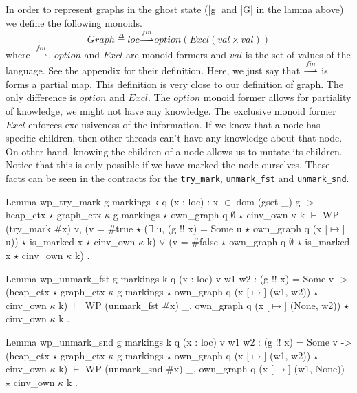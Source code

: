\documentclass[nocopyrightspace]{sigplanconf}
\def\MyMLe{\lstinline[language=MyML, basicstyle=\small\ttfamily]}
\newcommand{\defeq}{\overset{\Delta}{=}}
\newcommand{\val}{\mathit{val}}
\newcommand{\loc}{\mathit{loc}}
\newcommand{\option}{\mathit{option}}
\newcommand{\Excl}{\mathit{Excl}}
\newcommand{\finmap}{\overset{\mathit{fin}}{\rightharpoonup}}
\begin{document}
In order to represent graphs in the ghost state (\Coqe|g| and \Coqe|G| in the lamma above) we define the following monoids.
\[
\mathit{Graph} \defeq \loc \finmap \option(\Excl(\val \times \val))
\]
where $\finmap$, $\option$ and $\Excl$ are monoid formers and $\val$ is the set of values of the language.
See the appendix for their definition.
Here, we just say that $\finmap$ is forms a partial map.
This definition is very close to our definition of graph.
The only difference is $\option$ and $\Excl$.
The $\option$ monoid former allows for partiality of knowledge,
we might not have any knowledge.
The exclusive monoid former $\Excl$ enforces exclusiveness of the
information.
If we know that a node has specific children, then other threads
can't have any knowledge about that node.
On other hand, knowing the children of a node allows us to mutate its
children. Notice that this is only possible if we have marked the node
ourselves.
These facts can be seen in the contracts for the \MyMLe{try_mark},
\MyMLe{unmark_fst} and \MyMLe{unmark_snd}.
\begin{Coq}
Lemma wp_try_mark g markings k q (x : loc) : x $\in$ dom (gset _) g ->
    heap_ctx $\star$ graph_ctx $\kappa$ g markings $\star$ own_graph q $\emptyset$
     $\star$ cinv_own $\kappa$ k
    $\vdash$ WP (try_mark $\#$x) {{ v,
         (v = $\#$true $\star$ ($\exists$ u, (g !! x) = Some u $\star$ own_graph q (x [$\mapsto$] u))
          $\star$ is_marked x $\star$ cinv_own $\kappa$ k)
           $\lor$ (v = $\#$false $\star$ own_graph q $\emptyset$ $\star$ is_marked x
              $\star$ cinv_own $\kappa$ k) }}.
\end{Coq}

\begin{Coq}
Lemma wp_unmark_fst g markings k q (x : loc) v w1 w2 :
    (g !! x) = Some v ->
    (heap_ctx $\star$ graph_ctx $\kappa$ g markings
     $\star$ own_graph q (x [$\mapsto$] (w1, w2)) $\star$ cinv_own $\kappa$ k) $\vdash$
      WP (unmark_fst $\#$x)
      {{ _, own_graph q (x [$\mapsto$] (None, w2)) $\star$ cinv_own $\kappa$ k }}.
\end{Coq}

\begin{Coq}
Lemma wp_unmark_snd g markings k q (x : loc) v w1 w2 :
    (g !! x) = Some v ->
    (heap_ctx $\star$ graph_ctx $\kappa$ g markings
    $\star$ own_graph q (x [$\mapsto$] (w1, w2)) $\star$ cinv_own $\kappa$ k) $\vdash$
      WP (unmark_snd $\#$x)
      {{ _, own_graph q (x [$\mapsto$] (w1, None)) $\star$ cinv_own $\kappa$ k }}.
\end{Coq}
\end{document}
